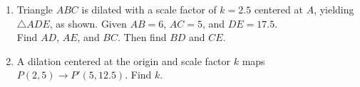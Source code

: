 \documentclass[12pt, twoside]{article}
\begin{document}
\begin{enumerate}
\item Triangle $ABC$ is dilated with a scale factor of $k=2.5$ centered at $A$, yielding $\triangle ADE$, as shown. Given $AB=6$, $AC=5$, and $DE=17.5$. \\[0.25cm] Find $AD$, $AE$, and $BC$. Then find $BD$ and $CE$.
\begin{flushright}
\end{flushright} \vspace{2cm}

\item A dilation centered at the origin and scale factor $k$ maps $P(2,5) \rightarrow P'(5,12.5)$. Find $k$.


\end{enumerate}
\end{document}
